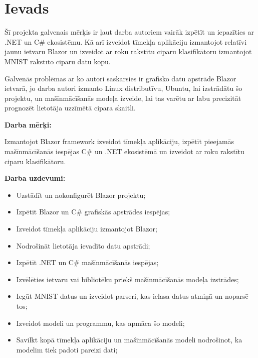 \section{Ievads}

    Šī projekta galvenais mērķis ir ļaut darba autoriem vairāk izpētīt un iepazīties
    ar .NET un C\# ekosistēmu. Kā arī izveidot tīmekļa aplikāciju izmantojot relatīvi
    jaunu ietvaru Blazor un izveidot ar roku rakstītu ciparu klasifikātoru izmantojot
    MNIST rakstīto ciparu datu kopu.

    Galvenās problēmas ar ko autori saskarsies ir grafisko datu apstrāde Blazor ietvarā,
    jo darba autori izmanto Linux distributīvu, Ubuntu, lai izstrādātu šo projektu, un
    mašīnmācīšanās modeļa izveide, lai tas varētu ar labu precizitāt prognozēt lietotāja
    uzzīmētā cipara skaitli.

    \textbf{Darba mērķi:}

    Izmantojot Blazor framework izveidot tīmekļa aplikāciju, izpētīt pieejamās mašīnmācīšanās
    iespējas C\# un .NET ekosistēmā un izveidot ar roku rakstītu ciparu klasifikātoru.

    \textbf{Darba uzdevumi:}

    \begin{itemize}
        \item Uzstādīt un nokonfigurēt Blazor projektu;
        \item Izpētīt Blazor un C\# grafiskās apstrādes iespējas;
        \item Izveidot tīmekļa aplikāciju izmantojot Blazor;
        \item Nodrošināt lietotāja ievadīto datu apstrādi;
        \item Izpētīt .NET un C\# mašīnmācīšanās iespējas;
        \item Izvēlēties ietvaru vai bibliotēku priekš mašīnmācīšanās modeļa izstrādes;
        \item Iegūt MNIST datus un izveidot parseri, kas ielasa datus atmiņā un noparsē tos;
        \item Izveidot modeli un programmu, kas apmāca šo modeli;
        \item Savilkt kopā tīmekļa aplikāciju un mašīnmācīšanās modeli nodrošinot, ka modelim tiek padoti pareizi dati;
    \end{itemize}

